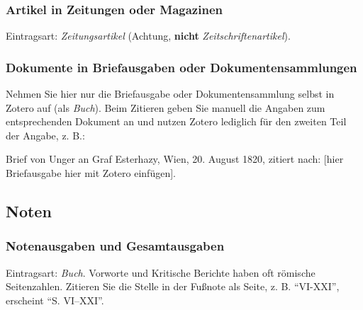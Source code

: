 \subsubsection{Artikel in Zeitungen oder Magazinen}
Eintragsart: \textit{Zeitungsartikel} (Achtung, \textbf{nicht} \textit{Zeitschriftenartikel}).
\newpage %
\subsubsection{Dokumente in Briefausgaben oder Dokumentensammlungen}
Nehmen Sie hier nur die Briefausgabe oder Dokumentensammlung selbst in Zotero auf (als \textit{Buch}). Beim Zitieren geben Sie manuell die Angaben zum entsprechenden Dokument an und nutzen Zotero lediglich für den zweiten Teil der Angabe, z. B.:
\begin{displayquote}
Brief von Unger an Graf Esterhazy, Wien, 20. August 1820, zitiert nach: [hier Briefausgabe hier mit Zotero einfügen].
\end{displayquote}
\subsection{Noten}
\subsubsection{Notenausgaben und Gesamtausgaben}
Eintragsart: \textit{Buch}.
Vorworte und Kritische Berichte haben oft römische Seitenzahlen. Zitieren Sie die Stelle in der Fußnote als Seite, z. B. "`VI-XXI"', erscheint "`S. VI--XXI"'.
%
